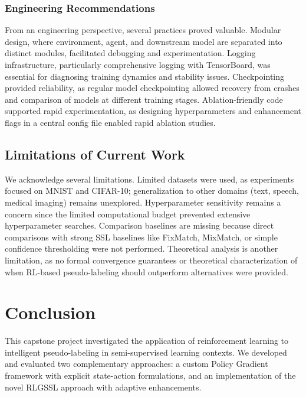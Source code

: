 \documentclass{scrartcl}
\begin{document}
\subsubsection{Engineering Recommendations}

From an engineering perspective, several practices proved valuable. Modular design, where environment, agent, and downstream model are separated into distinct modules, facilitated debugging and experimentation. Logging infrastructure, particularly comprehensive logging with TensorBoard, was essential for diagnosing training dynamics and stability issues. Checkpointing provided reliability, as regular model checkpointing allowed recovery from crashes and comparison of models at different training stages. Ablation-friendly code supported rapid experimentation, as designing hyperparameters and enhancement flags in a central config file enabled rapid ablation studies.

\subsection{Limitations of Current Work}

We acknowledge several limitations. Limited datasets were used, as experiments focused on MNIST and CIFAR-10; generalization to other domains (text, speech, medical imaging) remains unexplored. Hyperparameter sensitivity remains a concern since the limited computational budget prevented extensive hyperparameter searches. Comparison baselines are missing because direct comparisons with strong SSL baselines like FixMatch, MixMatch, or simple confidence thresholding were not performed. Theoretical analysis is another limitation, as no formal convergence guarantees or theoretical characterization of when RL-based pseudo-labeling should outperform alternatives were provided.



\section{Conclusion}

This capstone project investigated the application of reinforcement learning to intelligent pseudo-labeling in semi-supervised learning contexts. We developed and evaluated two complementary approaches: a custom Policy Gradient framework with explicit state-action formulations, and an implementation of the novel RLGSSL approach with adaptive enhancements.
\end{document}
